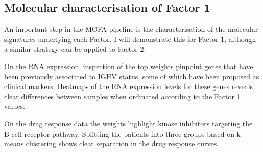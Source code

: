 
\subsection{Molecular characterisation of Factor 1}

An important step in the MOFA pipeline is the characterisation of the molecular signatures underlying each Factor. I will demonstrate this for Factor 1, although a similar strategy can be applied to Factor 2.

On the RNA expression, inspection of the top weights pinpoint genes that have been previously associated to IGHV status, some of which have been proposed as clinical markers\cite{Vasconcelos2005,Morabito2015}. Heatmaps of the RNA expression levels for these genes reveals clear differences between samples when ordinated according to the Factor 1 values.

On the drug response data the weights highlight kinase inhibitors targeting the B-cell receptor pathway. Splitting the patients into three groups based on k-means clustering shows clear separation in the drug response curves.

